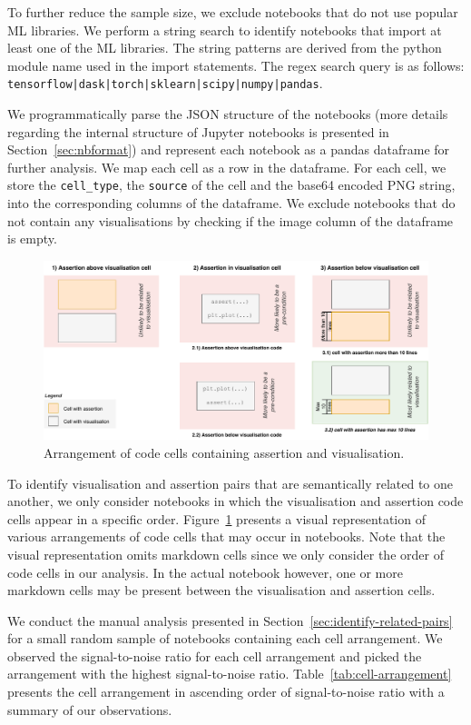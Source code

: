\documentclass[conference]{IEEEtran}
\begin{document}
To further reduce the sample size, we exclude notebooks that do not use popular ML libraries. We perform a string search to identify notebooks that import at least one of the ML libraries. The string patterns are derived from the python module name used in the import statements. The regex search query is as follows: \texttt{tensorflow|dask|torch|sklearn|scipy|numpy|pandas}.

We programmatically parse the JSON structure of the notebooks (more details regarding the internal structure of Jupyter notebooks is presented in Section~\ref{sec:nbformat}) and represent each notebook as a pandas dataframe for further analysis. We map each cell as a row in the dataframe. For each cell, we store the \texttt{cell\_type}, the \texttt{source} of the cell and the base64 encoded PNG string, into the corresponding columns of the dataframe. We exclude notebooks that do not contain any visualisations by checking if the image column of the dataframe is empty.

\begin{figure}
  \centering
  \includegraphics[width=\textwidth]{nb-structure.pdf}
  \caption{Arrangement of code cells containing assertion and
    visualisation.}
  \label{fig:cell-arrangement}
\end{figure}

To identify visualisation and assertion pairs that are semantically related to one another, we only consider notebooks in which the visualisation and assertion code cells appear in a specific order. Figure~\ref{fig:cell-arrangement} presents a visual representation of various arrangements of code cells that may occur in notebooks. Note that the visual representation omits markdown cells since we only consider the order of code cells in our analysis. In the actual notebook however, one or more markdown cells may be present between the visualisation and assertion cells.

We conduct the manual analysis presented in Section~\ref{sec:identify-related-pairs} for a small random sample of notebooks containing each cell arrangement. We observed the signal-to-noise ratio for each cell arrangement and picked the arrangement with the highest signal-to-noise ratio. Table~\ref{tab:cell-arrangement} presents the cell arrangement in ascending order of signal-to-noise ratio with a summary of our observations.
\end{document}
